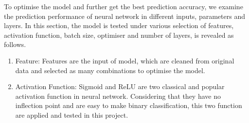 \documentclass[
10pt, %
a4paper, %
oneside, %
headinclude,footinclude, %
BCOR5mm, %
]{scrartcl}
\begin{document}
To optimise the model and further get the best prediction accuracy, we examine the prediction performance of neural network in different inputs, parameters and layers. In this section, the model is tested under various selection of features, activation function, batch size, optimiser and number of layers, is revealed as follows.

\begin{enumerate}
\item Feature: Features are the input of model, which are cleaned from original data and selected as many combinations to optimise the model.
\item Activation Function: Sigmoid and ReLU are two classical and popular activation function in neural network. Considering that they have no inflection point and are easy to make binary classification, this two function are applied and tested in this project.


\end{enumerate}
\end{document}
